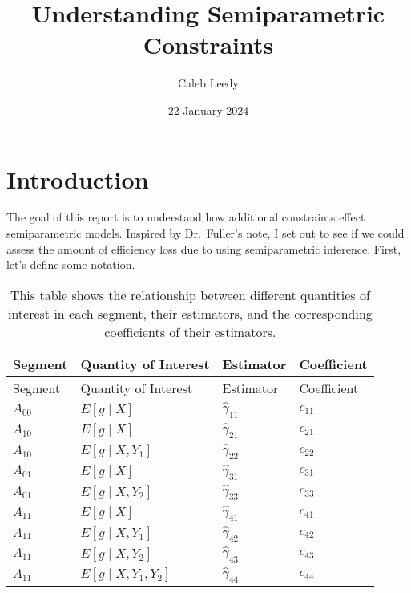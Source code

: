 \documentclass[
  letterpaper,
  DIV=11,
  numbers=noendperiod]{scrartcl}
\title{Understanding Semiparametric Constraints}
\author{Caleb Leedy}
\date{22 January 2024}
\begin{document}
\maketitle
\ifdefined\Shaded\renewenvironment{Shaded}{\begin{tcolorbox}[interior hidden, boxrule=0pt, frame hidden, borderline west={3pt}{0pt}{shadecolor}, breakable, enhanced, sharp corners]}{\end{tcolorbox}}\fi

\hypertarget{sec-intro}{%
\section{Introduction}\label{sec-intro}}

The goal of this report is to understand how additional constraints
effect semiparametric models. Inspired by Dr.~Fuller's note, I set out
to see if we could assess the amount of efficiency loss due to using
semiparametric inference. First, let's define some notation.

\hypertarget{tbl-reftab}{}
\begin{longtable}[]{@{}llll@{}}
\caption{\label{tbl-reftab}This table shows the relationship between
different quantities of interest in each segment, their estimators, and
the corresponding coefficients of their estimators.}\tabularnewline
\toprule\noalign{}
Segment & Quantity of Interest & Estimator & Coefficient \\
\midrule\noalign{}
\endfirsthead
\toprule\noalign{}
Segment & Quantity of Interest & Estimator & Coefficient \\
\midrule\noalign{}
\endhead
\bottomrule\noalign{}
\endlastfoot
\(A_{00}\) & \(E[g \mid X]\) & \(\hat \gamma_{11}\) & \(c_{11}\) \\
\(A_{10}\) & \(E[g \mid X]\) & \(\hat \gamma_{21}\) & \(c_{21}\) \\
\(A_{10}\) & \(E[g \mid X, Y_1]\) & \(\hat \gamma_{22}\) & \(c_{22}\) \\
\(A_{01}\) & \(E[g \mid X]\) & \(\hat \gamma_{31}\) & \(c_{31}\) \\
\(A_{01}\) & \(E[g \mid X, Y_2]\) & \(\hat \gamma_{33}\) & \(c_{33}\) \\
\(A_{11}\) & \(E[g \mid X]\) & \(\hat \gamma_{41}\) & \(c_{41}\) \\
\(A_{11}\) & \(E[g \mid X, Y_1]\) & \(\hat \gamma_{42}\) & \(c_{42}\) \\
\(A_{11}\) & \(E[g \mid X, Y_2]\) & \(\hat \gamma_{43}\) & \(c_{43}\) \\
\(A_{11}\) & \(E[g \mid X, Y_1, Y_2]\) & \(\hat \gamma_{44}\) &
\(c_{44}\) \\
\end{longtable}
\end{document}
